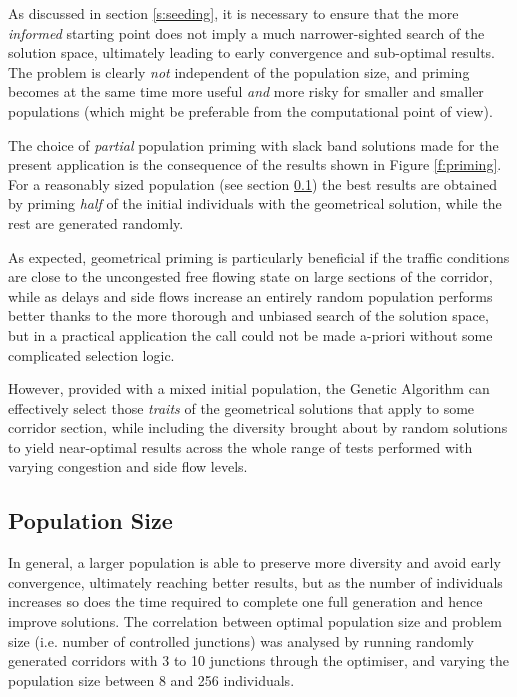 As discussed in section \ref{s:seeding}, it is necessary to ensure that the more \emph{informed} starting point does not imply a much narrower-sighted search of the solution space, ultimately leading to early convergence and sub-optimal results. The problem is clearly \emph{not} independent of the population size, and priming becomes at the same time more useful \emph{and} more risky for smaller and smaller populations (which might be preferable from the computational point of view).

The choice of \emph{partial} population priming with slack band solutions made for the present application is the consequence of the results shown in Figure \ref{f:priming}. For a reasonably sized population (see section \ref{r:popsize}) the best results are obtained by priming \emph{half} of the initial individuals with the geometrical solution, while the rest are generated randomly. 


As expected, geometrical priming is particularly beneficial if the traffic conditions are close to the uncongested free flowing state on large sections of the corridor, while as delays and side flows increase an entirely random population performs better thanks to the more thorough and unbiased search of the solution space, but in a practical application the call could not be made a-priori without some complicated selection logic.

However, provided with a mixed initial population, the Genetic Algorithm can effectively select those \emph{traits} of the geometrical solutions that apply to some corridor section, while including the diversity brought about by random solutions to yield near-optimal results across the whole range of tests performed with varying congestion and side flow levels.

\subsection{Population Size} \label{r:popsize}
In general, a larger population is able to preserve more diversity and avoid early convergence, ultimately reaching better results, but as the number of individuals increases so does the time required to complete one full generation and hence improve solutions. The correlation between optimal population size and problem size (i.e. number of controlled junctions) was analysed by running randomly generated corridors with 3 to 10 junctions through the optimiser, and varying the population size between 8 and 256 individuals. 
 
